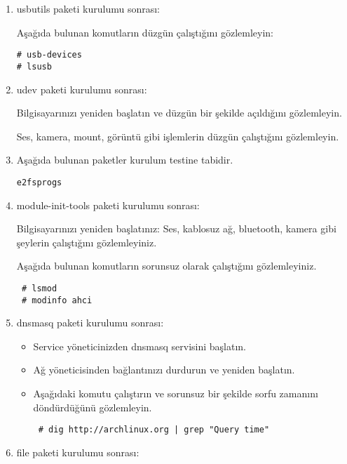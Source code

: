 \documentclass[a4paper,10pt]{article}
\begin{document}
\begin{enumerate}
\begin{verbatim}
\end{verbatim}


\item usbutils paketi kurulumu sonrası:

Aşağıda bulunan komutların düzgün çalıştığını gözlemleyin:
\begin{verbatim}
# usb-devices
# lsusb
\end{verbatim}


\item udev paketi kurulumu sonrası:

Bilgisayarınızı yeniden başlatın ve düzgün bir şekilde açıldığını gözlemleyin. 

Ses, kamera, mount, görüntü gibi işlemlerin düzgün çalıştığını gözlemleyin.
\item Aşağıda bulunan paketler kurulum testine tabidir.
\begin{verbatim}
e2fsprogs 
\end{verbatim}
\item module-init-tools paketi kurulumu sonrası:

Bilgisayarınızı yeniden başlatınız:
Ses, kablosuz ağ, bluetooth, kamera gibi şeylerin çalıştığını gözlemleyiniz.

Aşağıda bulunan komutların sorunsuz olarak çalıştığını gözlemleyiniz.
\begin{verbatim}
 # lsmod
 # modinfo ahci
\end{verbatim}


\item dnsmasq paketi kurulumu sonrası:

\begin{itemize}
 \item Service yöneticinizden dnsmasq servisini başlatın.
 \item Ağ yöneticisinden bağlantınızı durdurun ve yeniden başlatın.
 \item Aşağıdaki komutu çalıştırın ve sorunsuz bir şekilde sorfu zamanını döndürdüğünü gözlemleyin.
\begin{verbatim}
 # dig http://archlinux.org | grep "Query time"
\end{verbatim}

\end{itemize}


\item file paketi kurulumu sonrası:


\end{enumerate}
\end{document}
